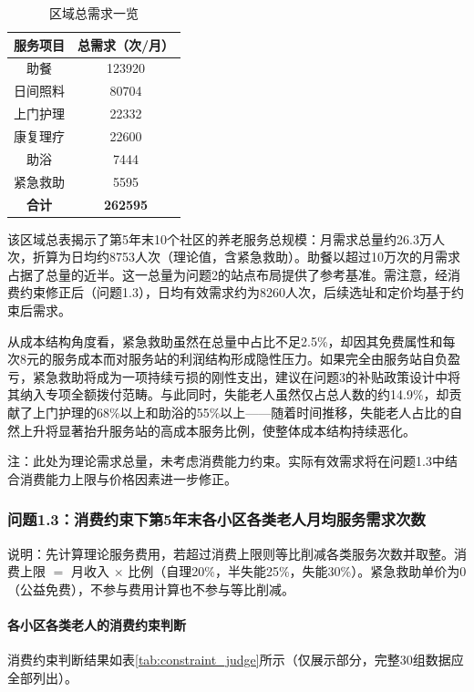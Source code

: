 \documentclass[UTF8]{ctexart}
\begin{document}
\begin{table}[H]
\centering
\caption{区域总需求一览}
\label{tab:region_total_demand}
\renewcommand{\arraystretch}{1.3}
\begin{tabular}{|c|c|}
\hline
\textbf{服务项目} & \textbf{总需求（次/月）} \\
\hline
助餐 & 123920 \\
\hline
日间照料 & 80704 \\
\hline
上门护理 & 22332 \\
\hline
康复理疗 & 22600 \\
\hline
助浴 & 7444 \\
\hline
紧急救助 & 5595 \\
\hline
\textbf{合计} & \textbf{262595} \\
\hline
\end{tabular}
\end{table}

该区域总表揭示了第5年末10个社区的养老服务总规模：月需求总量约26.3万人次，折算为日均约8753人次（理论值，含紧急救助）。助餐以超过10万次的月需求占据了总量的近半。这一总量为问题2的站点布局提供了参考基准。需注意，经消费约束修正后（问题1.3），日均有效需求约为8260人次，后续选址和定价均基于约束后需求。

从成本结构角度看，紧急救助虽然在总量中占比不足2.5\%，却因其免费属性和每次8元的服务成本而对服务站的利润结构形成隐性压力。如果完全由服务站自负盈亏，紧急救助将成为一项持续亏损的刚性支出，建议在问题3的补贴政策设计中将其纳入专项全额拨付范畴。与此同时，失能老人虽然仅占总人数的约14.9\%，却贡献了上门护理的68\%以上和助浴的55\%以上——随着时间推移，失能老人占比的自然上升将显著抬升服务站的高成本服务比例，使整体成本结构持续恶化。

注：此处为理论需求总量，未考虑消费能力约束。实际有效需求将在问题1.3中结合消费能力上限与价格因素进一步修正。

\subsubsection{问题1.3：消费约束下第5年末各小区各类老人月均服务需求次数}

说明：先计算理论服务费用，若超过消费上限则等比削减各类服务次数并取整。消费上限 $=$ 月收入 $\times$ 比例（自理20\%，半失能25\%，失能30\%）。紧急救助单价为0（公益免费），不参与费用计算也不参与等比削减。

\paragraph{各小区各类老人的消费约束判断}
消费约束判断结果如表\ref{tab:constraint_judge}所示（仅展示部分，完整30组数据应全部列出）。
\end{document}
